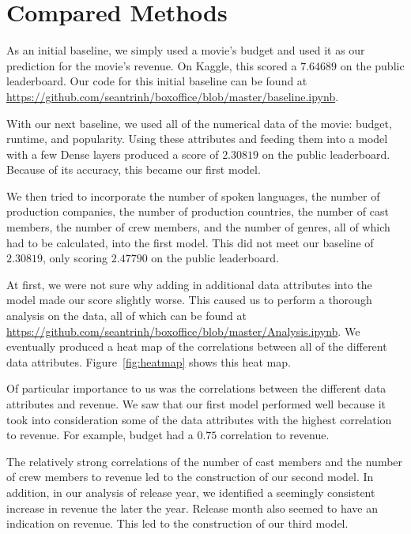 \documentclass[11pt]{article}
\numberwithin{equation}{section}
\begin{document}
\section{Compared Methods}

As an initial baseline, we simply used a movie's budget and used it as our prediction for the movie's revenue. On Kaggle, this scored a $7.64689$ on the public leaderboard. Our code for this initial baseline can be found at \url{https://github.com/seantrinh/boxoffice/blob/master/baseline.ipynb}.

With our next baseline, we used all of the numerical data of the movie: budget, runtime, and popularity. Using these attributes and feeding them into a model with a few Dense layers produced a score of $2.30819$ on the public leaderboard. Because of its accuracy, this became our first model. 

We then tried to incorporate the number of spoken languages, the number of production companies, the number of production countries, the number of cast members, the number of crew members, and the number of genres, all of which had to be calculated, into the first model. This did not meet our baseline of $2.30819$, only scoring $2.47790$ on the public leaderboard. 

At first, we were not sure why adding in additional data attributes into the model made our score slightly worse. This caused us to perform a thorough analysis on the data, all of which can be found at \url{https://github.com/seantrinh/boxoffice/blob/master/Analysis.ipynb}. We eventually produced a heat map of the correlations between all of the different data attributes. Figure~\ref{fig:heatmap} shows this heat map.

Of particular importance to us was the correlations between the different data attributes and revenue. We saw that our first model performed well because it took into consideration some of the data attributes with the highest correlation to revenue. For example, budget had a $0.75$ correlation to revenue. 

The relatively strong correlations of the number of cast members and the number of crew members to revenue led to the construction of our second model. In addition, in our analysis of release year, we identified a seemingly consistent increase in revenue the later the year. Release month also seemed to have an indication on revenue. This led to the construction of our third model. 
\end{document}
